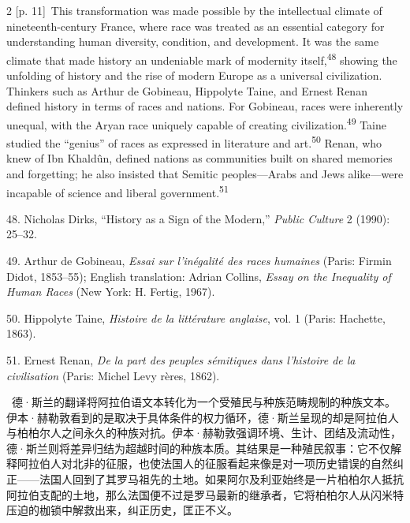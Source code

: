 \documentclass[10pt,a4paper]{article}
\begin{document}
\begin{paracol}{2}
{\scriptsize\color{gray} [p. 11]}\ This transformation was made possible by the intellectual climate of nineteenth-century France, where race was treated as an essential category for understanding human diversity, condition, and development. It was the same climate that made history an undeniable mark of modernity itself,\nobreak\textsuperscript{48} showing the unfolding of history and the rise of modern Europe as a universal civilization. Thinkers such as Arthur de Gobineau, Hippolyte Taine, and Ernest Renan defined history in terms of races and nations. For Gobineau, races were inherently unequal, with the Aryan race uniquely capable of creating civilization.\nobreak\textsuperscript{49} Taine studied the “genius” of races as expressed in literature and art.\nobreak\textsuperscript{50} Renan, who knew of Ibn Khaldûn, defined nations as communities built on shared memories and forgetting; he also insisted that Semitic peoples—Arabs and Jews alike—were incapable of science and liberal government.\nobreak\textsuperscript{51}\par{\small 48. Nicholas Dirks, “History as a Sign of the Modern,” \textit{Public Culture} 2 (1990): 25–32.\par}{\small 49. Arthur de Gobineau, \textit{Essai sur l’inégalité des races humaines} (Paris: Firmin Didot, 1853–55); English translation: Adrian Collins, \textit{Essay on the Inequality of Human Races} (New York: H. Fertig, 1967).\par}{\small 50. Hippolyte Taine, \textit{Histoire de la littérature anglaise}, vol. 1 (Paris: Hachette, 1863).\par}{\small 51. Ernest Renan, \textit{De la part des peuples sémitiques dans l’histoire de la civilisation} (Paris: Michel Levy rères, 1862).\par}
\switchcolumn*
{\scriptsize\color{gray} [p. 12]}\ 德·斯兰的翻译将阿拉伯语文本转化为一个受殖民与种族范畴规制的种族文本。伊本·赫勒敦看到的是取决于具体条件的权力循环，德·斯兰呈现的却是阿拉伯人与柏柏尔人之间永久的种族对抗。伊本·赫勒敦强调环境、生计、团结及流动性，德·斯兰则将差异归结为超越时间的种族本质。其结果是一种殖民叙事：它不仅解释阿拉伯人对北非的征服，也使法国人的征服看起来像是对一项历史错误的自然纠正——法国人回到了其罗马祖先的土地。如果阿尔及利亚始终是一片柏柏尔人抵抗阿拉伯支配的土地，那么法国便不过是罗马最新的继承者，它将柏柏尔人从闪米特压迫的枷锁中解救出来，纠正历史，匡正不义。\par
\switchcolumn

\end{paracol}
\end{document}
